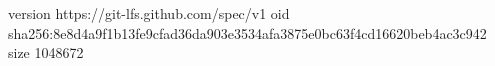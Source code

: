 version https://git-lfs.github.com/spec/v1
oid sha256:8e8d4a9f1b13fe9cfad36da903e3534afa3875e0bc63f4cd16620beb4ac3c942
size 1048672
